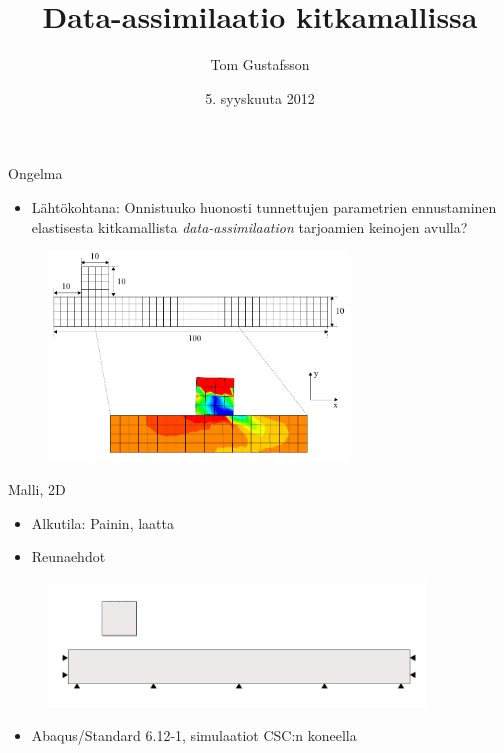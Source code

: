 \documentclass{beamer}
\title[Data-assimilaatio kitkamallissa]{Data-assimilaatio kitkamallissa}
\author{Tom Gustafsson}
\date{5. syyskuuta 2012}
\begin{document}
\begin{frame}
\titlepage
\end{frame}

\begin{frame}{Ongelma}

\begin{itemize}
\item Lähtökohtana: Onnistuuko huonosti tunnettujen parametrien ennustaminen elastisesta kitkamallista \emph{data-assimilaation} tarjoamien keinojen avulla?
\end{itemize}

\begin{figure}
\includegraphics[width=8cm]{fretting_mesh.pdf}
\end{figure}

\end{frame}

\begin{frame}{Malli, 2D}

\begin{itemize}
\item Alkutila: Painin, laatta
\item Reunaehdot
\end{itemize}

\begin{figure}
\includegraphics[width=10cm]{fretting_geom.pdf}
\end{figure}

\begin{itemize}
\item Abaqus/Standard 6.12-1, simulaatiot CSC:n koneella
\end{itemize}

\end{frame}
\end{document}
